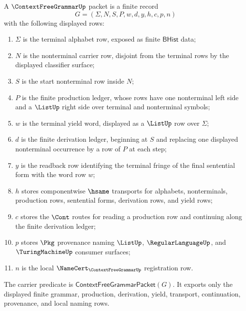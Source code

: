\begin{definition}
\label{def:contextfreegrammar-bhist-carrier}
A $\ContextFreeGrammarUp$ packet is a finite record
$$
G=(\Sigma,N,S,P,w,d,y,h,c,p,n)
$$
with the following displayed rows:
\begin{enumerate}
\item $\Sigma$ is the terminal alphabet row, exposed as finite
  $\mathsf{BHist}$ data;
\item $N$ is the nonterminal carrier row, disjoint from the terminal rows by
  the displayed classifier surface;
\item $S$ is the start nonterminal row inside $N$;
\item $P$ is the finite production ledger, whose rows have one nonterminal
  left side and a $\ListUp$ right side over terminal and nonterminal symbols;
\item $w$ is the terminal yield word, displayed as a $\ListUp$ row over
  $\Sigma$;
\item $d$ is the finite derivation ledger, beginning at $S$ and replacing one
  displayed nonterminal occurrence by a row of $P$ at each step;
\item $y$ is the readback row identifying the terminal fringe of the final
  sentential form with the word row $w$;
\item $h$ stores componentwise $\hsame$ transports for alphabets,
  nonterminals, production rows, sentential forms, derivation rows, and yield
  rows;
\item $c$ stores the $\Cont$ routes for reading a production row and
  continuing along the finite derivation ledger;
\item $p$ stores $\Pkg$ provenance naming $\ListUp$, $\RegularLanguageUp$, and
  $\TuringMachineUp$ consumer surfaces;
\item $n$ is the local $\NameCert_{\ContextFreeGrammarUp}$ registration row.
\end{enumerate}
The carrier predicate is
$\mathsf{ContextFreeGrammarPacket}(G)$. It exports only the displayed finite
grammar, production, derivation, yield, transport, continuation, provenance,
and local naming rows.
\end{definition}


